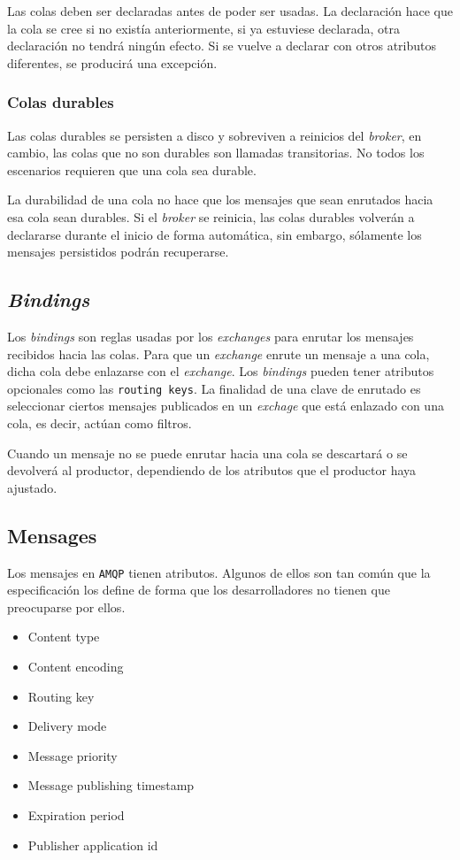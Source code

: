 Las colas deben ser declaradas antes de poder ser usadas. La declaración hace que
la cola se cree si no existía anteriormente, si ya estuviese declarada, otra
declaración no tendrá ningún efecto. Si se vuelve a declarar con otros atributos
diferentes, se producirá una excepción.

\subsubsection{Colas durables}

Las colas durables se persisten a disco y sobreviven a reinicios del \emph{broker},
en cambio, las colas que no son durables son llamadas transitorias. No todos los
escenarios requieren que una cola sea durable.

La durabilidad de una cola no hace que los mensajes que sean enrutados hacia esa
cola sean durables. Si el \emph{broker} se reinicia, las colas durables volverán
a declararse durante el inicio de forma automática, sin embargo, sólamente los
mensajes persistidos podrán recuperarse.

\subsection{\emph{Bindings}}

Los \emph{bindings} son reglas usadas por los \emph{exchanges} para enrutar los
mensajes recibidos hacia las colas. Para que un \emph{exchange} enrute un mensaje
a una cola, dicha cola debe enlazarse con el \emph{exchange}. Los \emph{bindings}
pueden tener atributos opcionales como las \texttt{routing keys}. La finalidad
de una clave de enrutado es seleccionar ciertos mensajes publicados en un \emph{exchage}
que está enlazado con una cola, es decir, actúan como filtros.

Cuando un mensaje no se puede enrutar hacia una cola se descartará o se devolverá
al productor, dependiendo de los atributos que el productor haya ajustado.

\subsection{Mensages}

Los mensajes en \texttt{AMQP} tienen atributos. Algunos de ellos son tan común
que la especificación los define de forma que los desarrolladores no tienen que
preocuparse por ellos.

\begin{itemize}\itemsep1pt \parskip0pt 
\item Content type
\item Content encoding
\item Routing key
\item Delivery mode
\item Message priority
\item Message publishing timestamp
\item Expiration period
\item Publisher application id
\end{itemize}

